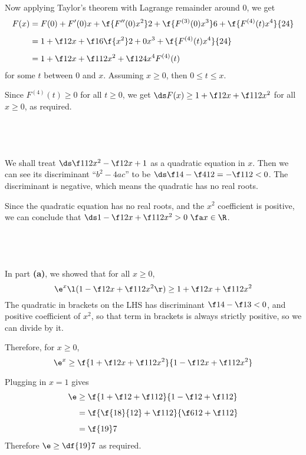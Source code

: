 \documentclass[a4paper]{article}
\begin{document}
Now applying Taylor's theorem with Lagrange remainder around 0, we get \begin{align*}
F(x) &= F(0) + F'(0) x + \f{F''(0) x^2}2 + \f{F^{(3)}(0) x^3}6 + \f{F^{(4)}(t) x^4}{24}\\[1ex]
&= 1 + \f12 x + \f16 \f{x^2}2 + 0 x^3 + \f{F^{(4)}(t) x^4}{24}\\[1ex]
&= 1 + \f12 x + \f1{12} x^2 + \f1{24} x^4 F^{(4)}(t)
\end{align*}
for some $t$ between $0$ and $x$. Assuming $x \ge 0$, then $0 \le t \le x$.

Since $F^{(4)}(t) \ge 0$ for all $t \ge 0$, we get $\ds F(x) \ge 1 + \f12 x + \f1{12} x^2$ for all $x \ge 0$, as required.

\subsection{~}

We shall treat $\ds \f1{12} x^2 - \f12 x + 1$ as a quadratic equation in $x$. Then we can see its discriminant \enquote{$b^2 - 4ac$} to be $\ds \f14 - \f4{12} = -\f1{12} < 0$. The discriminant is negative, which means the quadratic has no real roots.

Since the quadratic equation has no real roots, and the $x^2$ coefficient is positive, we can conclude that $\ds 1 - \f12 x + \f1{12} x^2 > 0\ \fa x \in \R$.

\subsection{~}

In part \textbf{(a)}, we showed that for all $x \ge 0$, $$\e^x \l( 1 - \f12 x + \f1{12} x^2 \r) \ge 1 + \f12 x + \f1{12} x^2$$
The quadratic in brackets on the LHS has discriminant $\f14 - \f13 < 0$, and positive coefficient of $x^2$, so that term in brackets is always strictly positive, so we can divide by it.

Therefore, for $x \ge 0$, $$\e^x \ge \f{1 + \f12 x + \f1{12} x^2}{1 - \f12 x + \f1{12} x^2}$$

Plugging in $x=1$ gives \begin{align*}
\e &\ge \f{1 + \f12 + \f1{12}}{1 - \f12 + \f1{12}}\\[1ex]
&= \f{\f{18}{12} + \f1{12}}{\f6{12} + \f1{12}}\\[1ex]
&= \f{19}7
\end{align*}
Therefore $\e \ge \df{19}7$ as required.

\end{document}
